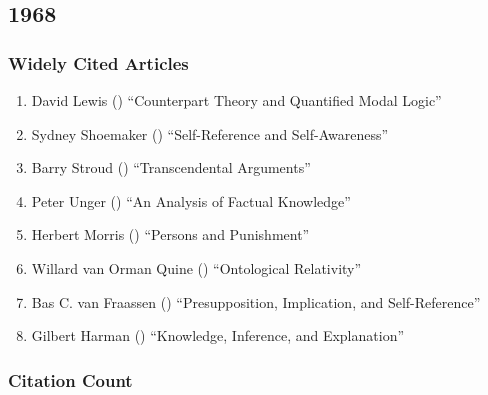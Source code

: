 \documentclass[
  10pt,
  letterpaper,
  DIV=11,
  numbers=noendperiod,
  twoside]{scrartcl}
\providecommand{\tightlist}{%
  \setlength{\itemsep}{0pt}\setlength{\parskip}{0pt}}\usepackage{longtable,booktabs,array}
\begin{document}
\newpage

\subsection{1968}\label{sec-s1968}

\subsubsection*{Widely Cited Articles}\label{widely-cited-articles-11}

\begin{enumerate}
\def\labelenumi{\arabic{enumi}.}
\tightlist
\item
  David Lewis () ``Counterpart
  Theory and Quantified Modal Logic''
\item
  Sydney Shoemaker ()
  ``Self-Reference and Self-Awareness''
\item
  Barry Stroud ()
  ``Transcendental Arguments''
\item
  Peter Unger () ``An Analysis of
  Factual Knowledge''
\item
  Herbert Morris () ``Persons and
  Punishment''
\item
  Willard van Orman Quine ()
  ``Ontological Relativity''
\item
  Bas C. van Fraassen ()
  ``Presupposition, Implication, and Self-Reference''
\item
  Gilbert Harman () ``Knowledge,
  Inference, and Explanation''
\end{enumerate}

\subsubsection*{Citation Count}\label{sec-count-1968}
\end{document}
